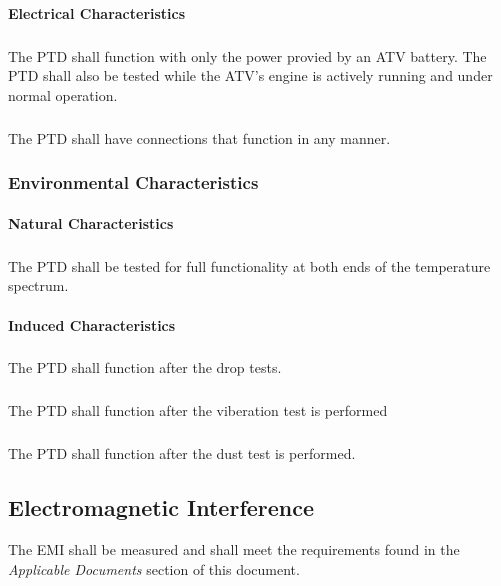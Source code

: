 \documentclass[11pt]{article}
\begin{document}
\paragraph{Electrical Characteristics}
    \subparagraph{} \hangindent=4cm The PTD shall function with only the power provied by an ATV battery. The PTD shall also be tested while the 
ATV's engine is actively running and under normal operation.
    \subparagraph{} \hangindent=4cm The PTD shall have connections that function in any manner.

\subsubsection{Environmental Characteristics}

\paragraph{Natural Characteristics}
    \subparagraph{} \hangindent=4cm The PTD shall be tested for full functionality at both ends of the temperature spectrum.

\paragraph{Induced Characteristics}
    \subparagraph{} \hangindent=4cm The PTD shall function after the drop tests.
    \subparagraph{} \hangindent=4cm The PTD shall function after the viberation test is performed
    \subparagraph{} \hangindent=4cm The PTD shall function after the dust test is performed.

\subsection{Electromagnetic Interference}
The EMI shall be measured and shall meet the requirements found in the \textit{Applicable Documents} section of this document.
\end{document}
